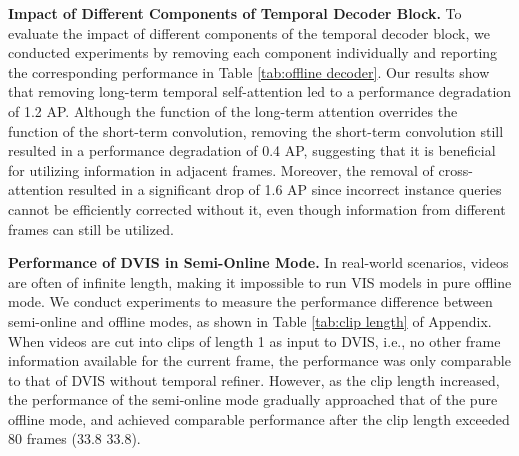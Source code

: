 \documentclass[10pt,twocolumn,letterpaper]{article}
\begin{document}
\textbf{Impact of Different Components of Temporal Decoder Block.} To evaluate the impact of different components of the temporal decoder block, we conducted experiments by removing each component individually and reporting the corresponding performance in Table \ref{tab:offline decoder}. Our results show that removing long-term temporal self-attention led to a performance degradation of 1.2 AP. Although the function of the long-term attention overrides the function of the short-term convolution, removing the short-term convolution still resulted in a performance degradation of 0.4 AP, suggesting that it is beneficial for utilizing information in adjacent frames. Moreover, the removal of cross-attention resulted in a significant drop of 1.6 AP since incorrect instance queries cannot be efficiently corrected without it, even though information from different frames can still be utilized.

\textbf{Performance of DVIS in Semi-Online Mode.} In real-world scenarios, videos are often of infinite length, making it impossible to run VIS models in pure offline mode. We conduct experiments to measure the performance difference between semi-online and offline modes, as shown in Table \ref{tab:clip length} of Appendix. When videos are cut into clips of length 1 as input to DVIS, i.e., no other frame information available for the current frame, the performance was only comparable to that of DVIS without temporal refiner. However, as the clip length increased, the performance of the semi-online mode gradually approached that of the pure offline mode, and achieved comparable performance after the clip length exceeded 80 frames (33.8  33.8).
\end{document}
